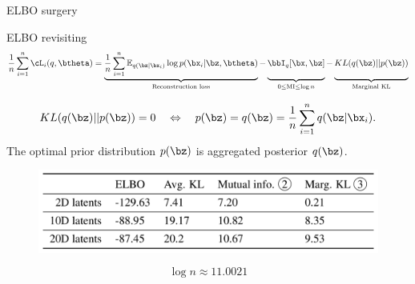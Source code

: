 \begin{frame}{ELBO surgery}
	\begin{block}{ELBO revisiting}
	\vspace{-0.6cm}
	{\footnotesize
	\[
	    \frac{1}{n} \sum_{i=1}^n \cL_i(q, \btheta) = \underbrace{\frac{1}{n} \sum_{i=1}^n \mathbb{E}_{q(\bz | \bx_i)} \log p(\bx_i | \bz, \btheta)}_{\text{Reconstruction loss}}
	    - \underbrace{\vphantom{ \sum_{i=1}^n} \bbI_q [\bx, \bz]}_{0 \leq \text{MI} \leq \log n } - \underbrace{\vphantom{ \sum_{i=1}^n} KL(q(\bz) || p(\bz))}_{\text{Marginal KL}}
	\]
	}
	\end{block}
	\vspace{-0.6cm}
	\[
	    KL(q(\bz) || p(\bz)) = 0 \quad \Leftrightarrow \quad p (\bz) = q(\bz) = \frac{1}{n} \sum_{i=1}^n q(\bz | \bx_i).
	\]
	The optimal prior distribution $p(\bz)$ is aggregated posterior $q(\bz)$.
	\vspace{-0.3cm}
	\begin{figure}
	    \centering
	    \includegraphics[width=0.7\linewidth]{figs/ELBO_surgery.png}
	\end{figure}
	\vspace{-0.3cm}
	\[
	\log n \approx 11.0021
	\]
\end{frame}
